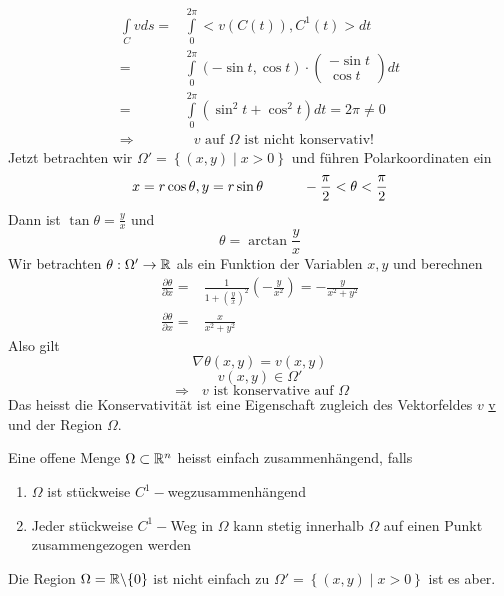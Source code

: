 \begin{enumerate}
\begin{align*}
\int\limits_C vds  = & \int\limits_0^{2\pi } { < v\left( {C\left( t \right)} \right),C^1\left( t \right) > dt} \\
= & \int\limits_0^{2\pi } \left( -\sin t,\cos t\right)\cdot  \left( {\begin{array}{*{20}{c}}
{ - \sin t}\\
{\cos t}
\end{array}} \right) dt\\
= & \int\limits_0^{2\pi } \left( \sin^2 t+\cos^2 t\right) dt=2\pi\not= 0\\
\Rightarrow &\text{ $v$ auf $\Omega$ ist nicht konservativ!}
\end{align*}
Jetzt betrachten wir $\Omega'=\left\{ \left( x,y\right) \mid x>0 \right\}$  und führen Polarkoordinaten ein \[x=r\cos\theta, y=r\sin\theta\hspace{10mm} -\frac{\pi}{2}<\theta <\frac{\pi}{2}\]
Dann ist $\tan\theta = \frac{y}{x}$ und \[\theta=\arctan\frac{y}{x}\]
Wir betrachten $\theta:\Omega'\to\mathbb{R}$ als ein Funktion der Variablen $x,y$ und berechnen
\begin{align*}
\frac{{\partial \theta }}{{\partial x}} = & \frac{1}{{1 + {{\left( {\frac{y}{x}} \right)}^2}}}\left( { - \frac{y}{{{x^2}}}} \right) =  - \frac{y}{{{x^2} + {y^2}}}\\
\frac{{\partial \theta }}{{\partial x}} = & \frac{x}{{{x^2} + {y^2}}}
\end{align*}
Also gilt
\[\nabla \theta\left( x,y\right) = v\left( x,y\right)\]
\[v\left( x,y\right) \in\Omega'\]
$$\Rightarrow\text{ $v$ ist konservative auf $\Omega$}$$
Das heisst die Konservativität ist eine Eigenschaft zugleich des Vektorfeldes $v$ \underline{v} und der Region $\Omega$.
\end{enumerate}

\begin{definition}{8.49}
Eine offene Menge $\Omega\subset\mathbb{R}^n$ heisst einfach zusammenhängend, falls
\begin{enumerate}
\item $\Omega$ ist stückweise $C^1-$wegzusammenhängend
\item Jeder stückweise $C^1-$Weg in $\Omega$ kann stetig innerhalb $\Omega$ auf einen Punkt zusammengezogen werden
\end{enumerate}
Die Region $\Omega=\mathbb{R}\backslash\{ 0\}$ ist nicht einfach zu $\Omega' = \left\{ \left( x,y\right) \mid x>0\right\}$ ist es aber.%
\end{definition}

